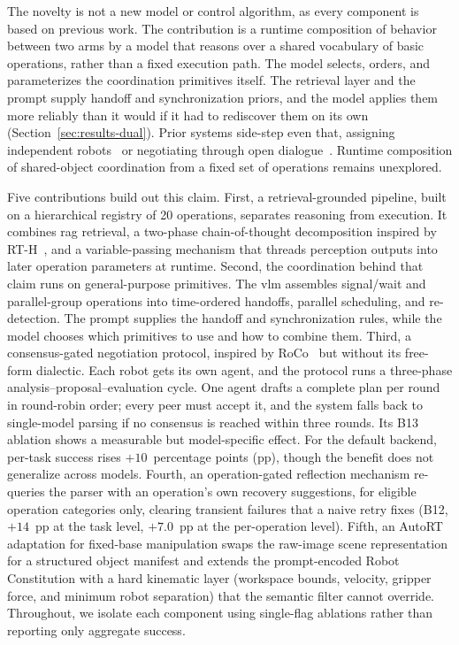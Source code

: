The novelty is not a new model or control algorithm, as every component is based on previous work. The contribution is a runtime composition of behavior between two arms by a model that reasons over a shared vocabulary of basic operations, rather than a fixed execution path. The model selects, orders, and parameterizes the coordination primitives itself. The retrieval layer and the prompt supply handoff and synchronization priors, and the model applies them more reliably than it would if it had to rediscover them on its own (Section~\ref{sec:results-dual}). Prior systems side-step even that, assigning independent robots~\cite{ahn2024autortembodiedfoundationmodels} or negotiating through open dialogue~\cite{mandi2023rocodialecticmultirobotcollaboration}. Runtime composition of shared-object coordination from a fixed set of operations remains unexplored.

Five contributions build out this claim. First, a retrieval-grounded pipeline, built on a hierarchical registry of 20 operations, separates reasoning from execution. It combines \gls{rag} retrieval, a two-phase chain-of-thought decomposition inspired by RT-H~\cite{belkhale2024rthactionhierarchiesusing}, and a variable-passing mechanism that threads perception outputs into later operation parameters at runtime. Second, the coordination behind that claim runs on general-purpose primitives. The \gls{vlm} assembles signal/wait and parallel-group operations into time-ordered handoffs, parallel scheduling, and re-detection. The prompt supplies the handoff and synchronization rules, while the model chooses which primitives to use and how to combine them. Third, a consensus-gated negotiation protocol, inspired by RoCo~\cite{mandi2023rocodialecticmultirobotcollaboration} but without its free-form dialectic. Each robot gets its own agent, and the protocol runs a three-phase analysis–proposal–evaluation cycle. One agent drafts a complete plan per round in round-robin order; every peer must accept it, and the system falls back to single-model parsing if no consensus is reached within three rounds. Its B13 ablation shows a measurable but model-specific effect. For the default backend, per-task success rises $+10$~percentage points (pp), though the benefit does not generalize across models. Fourth, an operation-gated reflection mechanism re-queries the parser with an operation’s own recovery suggestions, for eligible operation categories only, clearing transient failures that a naive retry fixes (B12, $+14$~pp at the task level, $+7.0$~pp at the per-operation level). Fifth, an AutoRT adaptation for fixed-base manipulation swaps the raw-image scene representation for a structured object manifest and extends the prompt-encoded Robot Constitution with a hard kinematic layer (workspace bounds, velocity, gripper force, and minimum robot separation) that the semantic filter cannot override. Throughout, we isolate each component using single-flag ablations rather than reporting only aggregate success.

